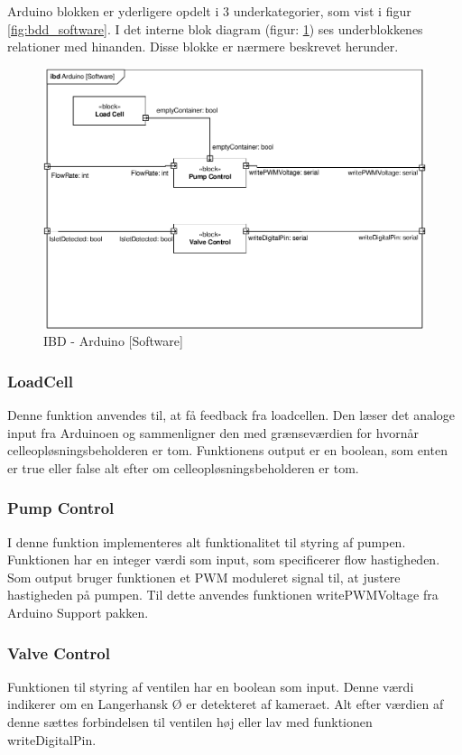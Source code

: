 \newpage

Arduino blokken er yderligere opdelt i 3 underkategorier, som vist i figur \ref{fig:bdd_software}. I det interne blok diagram (figur: \ref{fig:ibd_software_arduino}) ses underblokkenes relationer med hinanden. Disse blokke er nærmere beskrevet herunder.  
\begin{figure}[H]
	\centering
	\includegraphics[width=1\textwidth]{billeder/IBD_Software_Arduino-crop.pdf}
	\caption{IBD - Arduino [Software]}
	\label{fig:ibd_software_arduino}
\end{figure}
\subsubsection{LoadCell}
Denne funktion anvendes til, at få feedback fra loadcellen. Den læser det analoge input fra Arduinoen og sammenligner den med grænseværdien for hvornår celleopløsningsbeholderen er tom. Funktionens output er en boolean, som enten er true eller false alt efter om celleopløsningsbeholderen er tom.
\subsubsection{Pump Control}
I denne funktion implementeres alt funktionalitet til styring af pumpen. Funktionen har en integer værdi som input, som specificerer flow hastigheden. Som output bruger funktionen et PWM moduleret signal til, at justere hastigheden på pumpen. Til dette anvendes funktionen writePWMVoltage fra Arduino Support pakken.
\subsubsection{Valve Control}
Funktionen til styring af ventilen har en boolean som input. Denne værdi indikerer om en Langerhansk Ø er detekteret af kameraet. Alt efter værdien af denne sættes forbindelsen til ventilen høj eller lav med funktionen writeDigitalPin. 

